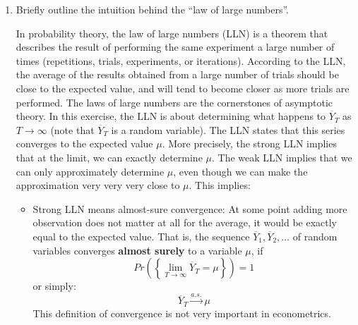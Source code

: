\documentclass[a4paper]{scrartcl}
\begin{document}
    \begin{enumerate}
        \item Briefly outline the intuition behind the \enquote{law of large numbers}.
              \begin{solution}
                  In probability theory, the law of large numbers (LLN) is a theorem that describes the result of performing the same experiment a large number of times (repetitions, trials, experiments, or iterations). According to the LLN, the average of the results obtained from a large number of trials should be close to the expected value, and will tend to become closer as more trials are performed. The laws of large numbers are the cornerstones of asymptotic theory. In this exercise, the LLN is about determining what happens to $\overline{Y}_T$ as $T\rightarrow\infty$ (note that $\overline{Y}_T$ is a random variable). The LLN states that this series converges to the expected value $\mu$. More precisely, the strong LLN implies that at the limit, we can exactly determine $\mu$. The weak LLN implies that we can only approximately determine $\mu$, even though we can make the approximation very very very close to $\mu$. This implies: 
                  \begin{itemize}
                      \item Strong LLN means almost-sure convergence: At some point adding more observation does not matter at all for the average, it would be exactly equal to the expected value. That is, the sequence $\overline{Y}_{1},\overline{Y}_{2},\ldots $ of random variables converges \textbf{almost surely} to a variable $\mu$, if
                            \begin{equation*}
                                Pr\left( \left\{ \lim_{T\rightarrow \infty }\overline{Y}_{T}=\mu\right\} \right) =1
                            \end{equation*}
                            or simply:
                            \begin{equation*}
                                \overline{Y}_{T}\overset{a.s.}{\rightarrow }\mu
                            \end{equation*}
                            This definition of convergence is not very important in econometrics.
                            

\end{itemize}
\end{solution}
\end{enumerate}
\end{document}
